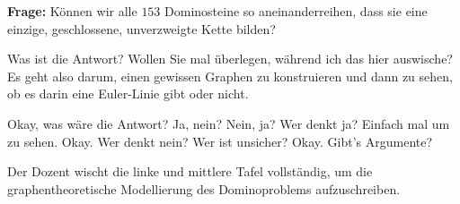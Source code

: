 \begin{math-stroke}
\textbf{Frage:} Können wir alle $153$ Dominosteine so aneinanderreihen, dass sie eine einzige, geschlossene, unverzweigte Kette bilden?
\begin{center}
\end{center}
\end{math-stroke}

\begin{spoken-clean}[00:25:23 - 00:26:25]
Was ist die Antwort? Wollen Sie mal überlegen, während ich das hier auswische?  Es geht also darum, einen gewissen Graphen zu konstruieren und dann zu sehen, ob es darin eine Euler-Linie gibt oder nicht.

Okay, was wäre die Antwort? Ja, nein? Nein, ja? Wer denkt ja? Einfach mal um zu sehen. Okay. Wer denkt nein? Wer ist unsicher? Okay. Gibt's Argumente? 
\end{spoken-clean}

\begin{meta-note}[Tafelreinigung]
Der Dozent wischt die linke und mittlere Tafel vollständig, um die graphentheoretische Modellierung des Dominoproblems aufzuschreiben.
\end{meta-note}

